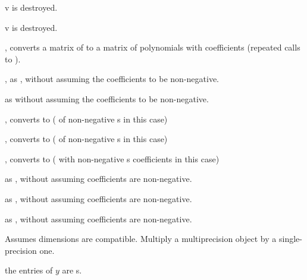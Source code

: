  v is destroyed.

 v is destroyed.

, converts a matrix of  to a matrix of
polynomials with  coefficients (repeated calls to ).

, as , without assuming
the coefficients to be non-negative.

 as  without assuming
the coefficients to be non-negative.

, converts to  ( of non-negative
s in this case)

, converts to  ( of non-negative
s in this case)

, converts to  ( with
non-negative s coefficients in this case)

 as , without assuming
coefficients are non-negative.

 as , without assuming
coefficients are non-negative.

 as , without assuming
coefficients are non-negative.



 Assumes dimensions are compatible.
Multiply a multiprecision object by a single-precision one.









 the entries of $y$ are s.

